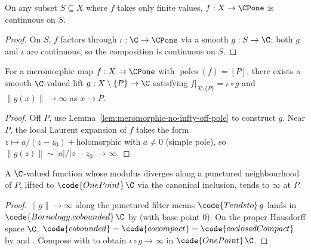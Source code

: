 \begin{lemma}
\label{lem:meromorphic-continuous-on-finite-set}

On any subset \(S\subseteq X\) where \(f\) takes only finite values,
\(f:X\to\CPone\) is continuous on \(S\).
\leanok
\end{lemma}
\begin{proof}\leanok
On \(S\), \(f\) factors through \(\iota:\C\to\CPone\) via a smooth
\(g:S\to\C\); both \(g\) and \(\iota\) are continuous, so the
composition is continuous on \(S\).
\end{proof}

\begin{lemma}
\label{lem:simple-pole-modulus-diverges}

For a meromorphic map \(f:X\to\CPone\) with \(\operatorname{poles}(f)=[P]\), there
exists a smooth \(\C\)-valued lift \(g:X\setminus\{P\}\to\C\)
satisfying \(f|_{X\setminus\{P\}}=\iota\circ g\) and
\(\|g(x)\|\to\infty\) as \(x\to P\).
\leanok
\end{lemma}
\begin{proof}\leanok
Off \(P\), use Lemma~\ref{lem:meromorphic-no-infty-off-pole} to
construct \(g\). Near \(P\), the local Laurent expansion of \(f\)
takes the form \(z\mapsto a/(z-z_{0})+\text{holomorphic}\) with
\(a\neq 0\) (simple pole), so \(\|g(z)\|\sim|a|/|z-z_{0}|\to\infty\).
\end{proof}

\begin{lemma}
\label{lem:onepoint-tendsto-infty-of-modulus-diverges}
A \(\C\)-valued function whose modulus diverges along a punctured
neighbourhood of \(P\), lifted to \(\code{OnePoint}\,\C\) via the
canonical inclusion, tends to \(\infty\) at \(P\).
\leanok
\end{lemma}
\begin{proof}\leanok
\(\|g\|\to\infty\) along the punctured filter means
\(\code{Tendsto}\,g\) lands in \(\code{Bornology.cobounded}\,\C\) by
 (with base point
\(0\)). On the proper Hausdorff space \(\C\),
\(\code{cobounded}=\code{cocompact}=\code{coclosedCompact}\) by
 and
. Compose with
 to obtain
\(\iota\circ g\to\infty\) in \(\code{OnePoint}\,\C\).
\end{proof}


